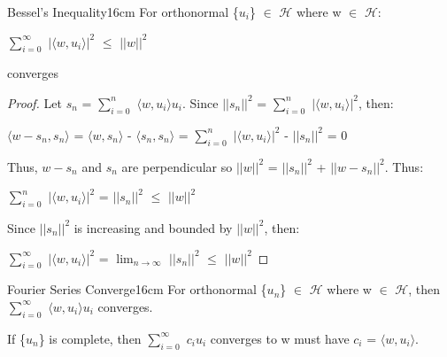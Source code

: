     \vspace{0.5cm}



    \begin{wtheorem}{Bessel's Inequality}{16cm}
        For orthonormal \{$u_i$\} $\in$ $\mathcal{H}$
        where w $\in$ $\mathcal{H}$:

        \hspace{0.5cm}
        $\sum_{i=0}^{\infty}$ $|\langle w , u_i \rangle|^2$
        $\leq$ $||w||^2$

        converges
    \end{wtheorem}

    \begin{proof}
        Let $s_n$ = $\sum_{i=0}^{n}$ $\langle w , u_i \rangle u_i$.
        Since $||s_n||^2$ = $\sum_{i=0}^{n}$ $|\langle w , u_i \rangle|^2$, then:

        \hspace{0.5cm}
        $\langle w-s_n , s_n \rangle$
        = $\langle w , s_n \rangle$ - $\langle s_n , s_n \rangle$
        = $\sum_{i=0}^{n}$ $|\langle w , u_i \rangle|^2$ - $||s_n||^2$
        = 0

        Thus, $w-s_n$ and $s_n$ are perpendicular so
        $||w||^2$ = $||s_n||^2$ + $||w-s_n||^2$. Thus:

        \hspace{0.5cm}
        $\sum_{i=0}^{n}$ $|\langle w , u_i \rangle|^2$
        = $||s_n||^2$ $\leq$ $||w||^2$

        Since $||s_n||^2$ is increasing and bounded by $||w||^2$, then:

        \hspace{0.5cm}
        $\sum_{i=0}^{\infty}$ $|\langle w , u_i \rangle|^2$
        = $\lim_{n \rightarrow \infty}$ $||s_n||^2$ $\leq$ $||w||^2$
    \end{proof}

    \vspace{0.5cm}



    \begin{wtheorem}{Fourier Series Converge}{16cm}
        For orthonormal \{$u_n$\} $\in$ $\mathcal{H}$ where w $\in$ $\mathcal{H}$,
        then $\sum_{i=0}^{\infty}$ $\langle w , u_i \rangle u_i$ converges.

        If \{$u_n$\} is complete, then
        $\sum_{i=0}^{\infty}$ $c_i u_i$ converges to w
        must have $c_i$ = $\langle w , u_i \rangle$.
    \end{wtheorem}

